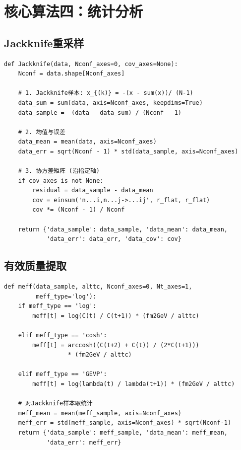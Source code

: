 \documentclass[11pt,a4paper]{ctexart}
\begin{document}
\section{核心算法四：统计分析}

\subsection{Jackknife重采样}

\begin{codebox}[Jackknife实现]
\begin{lstlisting}[style=python]
def Jackknife(data, Nconf_axes=0, cov_axes=None):
    Nconf = data.shape[Nconf_axes]

    # 1. Jackknife样本: x_{(k)} = -(x - sum(x))/ (N-1)
    data_sum = sum(data, axis=Nconf_axes, keepdims=True)
    data_sample = -(data - data_sum) / (Nconf - 1)

    # 2. 均值与误差
    data_mean = mean(data, axis=Nconf_axes)
    data_err = sqrt(Nconf - 1) * std(data_sample, axis=Nconf_axes)

    # 3. 协方差矩阵 (沿指定轴)
    if cov_axes is not None:
        residual = data_sample - data_mean
        cov = einsum('n...i,n...j->...ij', r_flat, r_flat)
        cov *= (Nconf - 1) / Nconf

    return {'data_sample': data_sample, 'data_mean': data_mean,
            'data_err': data_err, 'data_cov': cov}
\end{lstlisting}
\end{codebox}

\subsection{有效质量提取}

\begin{codebox}
\begin{lstlisting}[style=python]
def meff(data_sample, alttc, Nconf_axes=0, Nt_axes=1,
         meff_type='log'):
    if meff_type == 'log':
        meff[t] = log(C(t) / C(t+1)) * (fm2GeV / alttc)

    elif meff_type == 'cosh':
        meff[t] = arccosh((C(t+2) + C(t)) / (2*C(t+1)))
                  * (fm2GeV / alttc)

    elif meff_type == 'GEVP':
        meff[t] = log(lambda(t) / lambda(t+1)) * (fm2GeV / alttc)

    # 对Jackknife样本取统计
    meff_mean = mean(meff_sample, axis=Nconf_axes)
    meff_err = std(meff_sample, axis=Nconf_axes) * sqrt(Nconf-1)
    return {'data_sample': meff_sample, 'data_mean': meff_mean,
            'data_err': meff_err}
\end{lstlisting}
\end{codebox}
\end{document}
